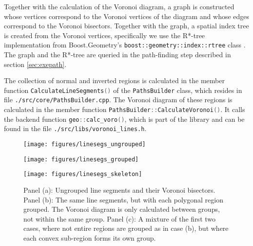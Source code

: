 Together with the calculation of the Voronoi diagram, a graph is constructed whose
vertices correspond to the Voronoi vertices of the diagram and whose edges correspond
to the Voronoi bisectors. 
Together with the graph, a spatial index tree is created from the Voronoi vertices,
specifically we use the R*-tree implementation from Boost.Geometry's 
\cite{web_boost_geometry} \lstinline[language=C++]|boost::geometry::index::rtree| class \cite{web_boost_geometry_rtree}.
The graph and the R*-tree are queried in the path-finding step described in section \ref{sec:exepath}.

The collection of normal and inverted regions is calculated in the member function
\lstinline[language=C++]|CalculateLineSegments()| of the \lstinline[language=C++]|PathsBuilder|
class, which resides in file \lstinline|./src/core/PathsBuilder.cpp|. 
The Voronoi diagram of these regions is calculated in the member function
\lstinline[language=C++]|PathsBuilder::CalculateVoronoi()|.
It calls the backend function \lstinline[language=C++]|geo::calc_voro()|, which is part
of the library and can be found in the file \lstinline|./src/libs/voronoi_lines.h|.


\begin{figure}
	\begin{minipage}{0.5 \textwidth}
		\begin{center}
			\texttt{[image: figures/linesegs\_ungrouped]}
		\end{center}
	\end{minipage}
	\begin{minipage}{0.5 \textwidth}
		\begin{center}
			\texttt{[image: figures/linesegs\_grouped]}
		\end{center}
	\end{minipage}
	\vspace{0.25cm}

	\begin{minipage}{0.5 \textwidth}
		\begin{center}
			\texttt{[image: figures/linesegs\_skeleton]}
		\end{center}
	\end{minipage}
	\caption[Voronoi diagrams for polygonal regions.]{
		Panel (a): Ungrouped line segments and their Voronoi bisectors.
		Panel (b): The same line segments, but with each polygonal region grouped.
		The Voronoi diagram is only calculated between groups, not within the same group.
		Panel (c): A mixture of the first two cases, where not entire regions are grouped
		as in case (b), but where each convex sub-region forms its own group.
		\label{fig:linesegs_grouped_voro}}
\end{figure}

